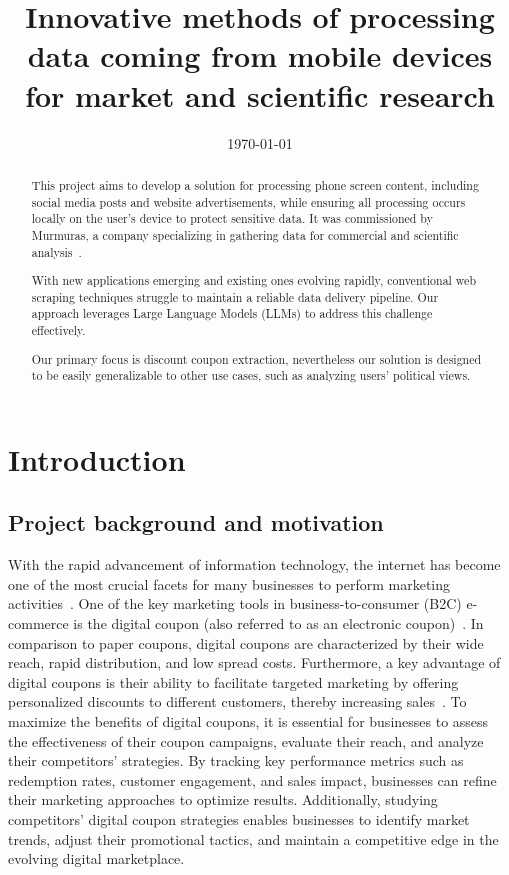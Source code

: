 \documentclass[licencjacka,en]{pracamgr}
\title{Innovative methods of processing data coming from mobile devices for market and scientific research}
\date{\today}
\begin{document}
\maketitle

\begin{abstract}
    This project aims to develop a solution for processing phone screen content, including social media posts and website advertisements, while ensuring all processing occurs locally on the user's device to protect sensitive data. It was commissioned by Murmuras, a company specializing in gathering data for commercial and scientific analysis~\cite{murmuras}.
    
    With new applications emerging and existing ones evolving rapidly, conventional web scraping techniques struggle to maintain a reliable data delivery pipeline. Our approach leverages Large Language Models (LLMs) to address this challenge effectively.

    Our primary focus is discount coupon extraction, nevertheless our solution is designed to be easily generalizable to other use cases, such as analyzing users' political views.
\end{abstract}

\tableofcontents

\chapter{Introduction}
\section{Project background and motivation}
With the rapid advancement of information technology, the internet has become one of the most crucial facets for many businesses to perform marketing activities~\cite{design_of_coupons}. One of the key marketing tools in business-to-consumer (B2C) e-commerce is the digital coupon (also referred to as an electronic coupon)~\cite{targeted_reminders}. In comparison to paper coupons, digital coupons are characterized by their wide reach, rapid distribution, and low spread costs. Furthermore, a key advantage of digital coupons is their ability to facilitate targeted marketing by offering personalized discounts to different customers, thereby increasing sales~\cite{design_of_coupons}. To maximize the benefits of digital coupons, it is essential for businesses to assess the effectiveness of their coupon campaigns, evaluate their reach, and analyze their competitors’ strategies. By tracking key performance metrics such as redemption rates, customer engagement, and sales impact, businesses can refine their marketing approaches to optimize results. Additionally, studying competitors' digital coupon strategies enables businesses to identify market trends, adjust their promotional tactics, and maintain a competitive edge in the evolving digital marketplace.
\end{document}
